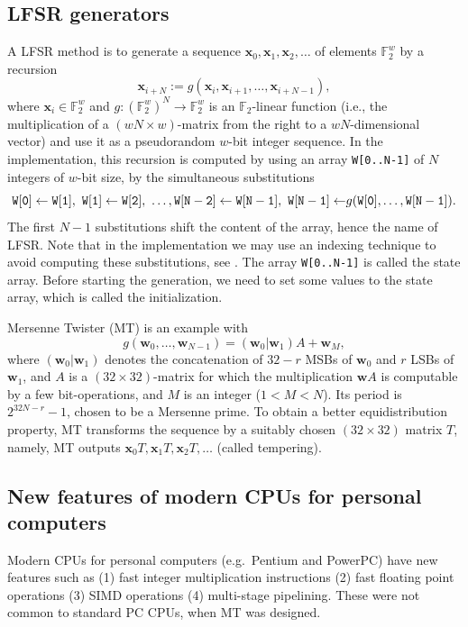 \documentclass{svmult}
\def\F2{{\mathbb F}_2}
\def\bx{{{\mathbf x}}}
\def\bw{{{\mathbf w}}}
\begin{document}
\subsection{LFSR generators}
A LFSR method is to generate
a sequence $\bx_0, \bx_1, \bx_2, \ldots$
of elements $\F2^{w}$ by a recursion
\begin{equation}\label{eq:recursion}
\bx_{i+N}:=g(\bx_i, \bx_{i+1}, \ldots, \bx_{i+N-1}),
\end{equation}
where $\bx_i \in \F2^{w}$ and 
$g:(\F2^{w})^N \to \F2^{w}$ is an $\F2$-linear function
(i.e., the multiplication of a $(wN \times w)$-matrix 
from the right to a $wN$-dimensional vector)
and use it as a pseudorandom $w$-bit integer sequence.
In the implementation, this recursion is computed
by using an array {\tt W[0..N-1]} of $N$ integers of $w$-bit size,
by the simultaneous substitutions
$$
{\tt
W[0] \leftarrow W[1],\ 
W[1] \leftarrow W[2],\  \ldots,
W[N-2] \leftarrow W[N-1],\  
W[N-1] \leftarrow} g({\tt W[0]},\ldots,{\tt W[N-1]}). 
$$
The first $N-1$ substitutions shift the content of 
the array, hence the name of LFSR. 
Note that in the implementation we may use 
an indexing technique to avoid
computing these substitutions, see \cite[P.28 Algorithm A]{knuth:bible}.
The array {\tt W[0..N-1]} is called the state array.
Before starting the generation, we need to 
set some values to the state array, 
which is called the initialization. 

Mersenne Twister (MT) \cite{MT}
is an example with
$$
g(\bw_0,\ldots,\bw_{N-1})=(\bw_0|\bw_1)A + \bw_M,
$$
where $(\bw_0|\bw_1)$ denotes
the concatenation of 
$32-r$ MSBs of $\bw_0$ and $r$ LSBs of $\bw_1$,
and $A$ is a $(32\times 32)$-matrix 
for which the multiplication $\bw A$ is computable 
by a few bit-operations, and $M$ is an integer
($1 < M < N$).
Its period is $2^{32N-r}-1$, chosen to be a Mersenne prime.
To obtain a better equidistribution property, 
MT transforms the sequence by
a suitably chosen $(32\times 32)$ matrix $T$,
namely, MT outputs
$\bx_0T , \bx_1T, \bx_2T, \ldots$
(called tempering).

\subsection{New features of modern CPUs for personal computers}
Modern CPUs for personal computers (e.g.\ Pentium and
PowerPC) have new features such as 
(1) fast integer multiplication instructions
(2) fast floating point operations 
(3) SIMD operations 
(4) multi-stage pipelining.
These were not common
to standard PC CPUs, when MT was designed.
\end{document}
